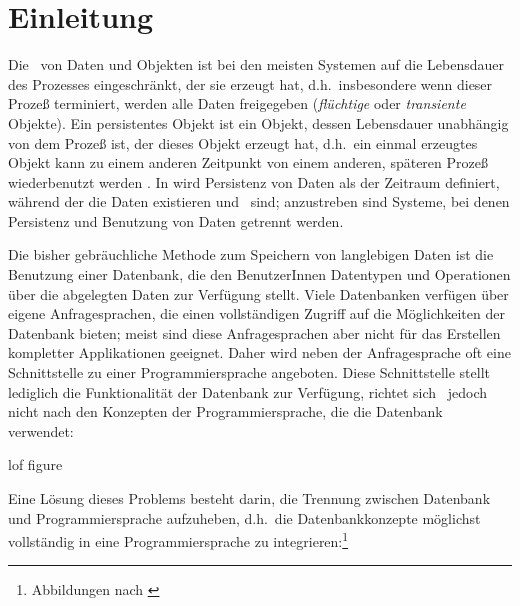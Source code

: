 %
\chapter{Einleitung}\label{chap:intro}
%
Die \ von Daten und Objekten ist bei den
meisten Systemen auf die Lebensdauer des Prozesses eingeschr\"{a}nkt, der
sie erzeugt hat, d.h.\ insbesondere wenn dieser Proze\ss{} terminiert,
werden alle Daten freigegeben ({\em fl\"{u}chtige\/} oder
{\em transiente\/} Objekte).  Ein persistentes Objekt ist ein Objekt,
dessen Lebensdauer unabh\"{a}ngig von dem Proze\ss{} ist, der dieses Objekt
erzeugt hat, d.h.\ ein einmal erzeugtes Objekt kann zu einem anderen
Zeitpunkt von einem anderen, sp\"{a}teren Proze\ss{} wiederbenutzt werden
\cite[]{bib:at89}. In \cite[]{bib:mo89a} wird
Persistenz von Daten als der Zeitraum definiert, w\"{a}hrend der die
Daten existieren und \ sind; anzustreben
sind Systeme, bei denen Persistenz und Benutzung von Daten getrennt
werden.
%
\par{}Die bisher gebr\"{a}uchliche Methode zum Speichern von langlebigen
Daten ist die Benutzung einer Datenbank, die den BenutzerInnen
Datentypen und Operationen \"{u}ber die abgelegten Daten zur Verf\"{u}gung
stellt.  Viele Datenbanken verf\"{u}gen \"{u}ber eigene Anfragesprachen, die
einen vollst\"{a}ndigen Zugriff auf die M\"{o}g\-lich\-kei\-ten der
Datenbank bieten; meist sind diese Anfragesprachen aber nicht f\"{u}r das
Erstellen kompletter Applikationen geeignet. Daher wird neben der
Anfragesprache oft eine Schnittstelle zu einer Programmiersprache
angeboten. Diese Schnittstelle stellt lediglich die Funktionalit\"{a}t
der Datenbank zur Verf\"{u}gung, richtet sich \ia\ jedoch nicht nach den
Konzepten der Programmiersprache, die die Datenbank verwendet:%
\footnotemark\addtocounter{footnote}{-1}%
%
\begin{figure}[htbp]%
\ifbuch%
\centerline{}%
\else%
\centerline{}%
\fi%
\end{figure}%
%
\addcontentsline%
 {lof}%
 {figure}%
 {\protect{}}%
%
\par\noindent{}Eine L\"{o}sung dieses Problems besteht darin, die
Trennung zwischen Datenbank und Programmiersprache aufzuheben,
d.h.\ die  Datenbankkonzepte m\"{o}glichst vollst\"{a}ndig in eine
Programmiersprache zu integrieren:\footnote{Abbildungen nach
\cite[]{bib:at89}} %
